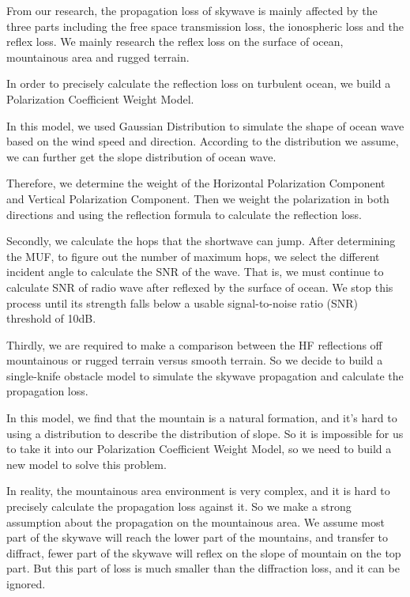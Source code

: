 \documentclass{mcmthesis}
\begin{document}
From our research, the propagation loss of skywave is mainly affected by the three parts including the free space transmission loss, the ionospheric loss and the reflex loss. We mainly research the reflex loss on the surface of ocean, mountainous area and rugged terrain.

In order to precisely calculate the reflection loss on turbulent ocean, we build a Polarization Coefficient Weight Model.

In this model, we used Gaussian Distribution to simulate the shape of ocean wave based on the wind speed and direction. According to the distribution we assume, we can further get the slope distribution of ocean wave.

 Therefore, we determine the weight of the Horizontal Polarization Component and Vertical Polarization Component. Then we weight the polarization in both directions and using the reflection formula to calculate the reflection loss.
 
Secondly, we calculate the hops that the shortwave can jump. After determining the MUF, to figure out the number of maximum hops, we select the different incident angle to calculate the SNR of the wave. That is, we must continue to calculate SNR of radio wave after reflexed by the surface of ocean. We stop this process until its strength falls below a usable signal-to-noise ratio (SNR) threshold of 10dB.

Thirdly, we are required to make a comparison between the HF reflections off mountainous or rugged terrain versus smooth terrain. So we decide to build a single-knife obstacle model to simulate the skywave propagation and calculate the propagation loss.

In this model, we find that the mountain is a natural formation, and it's hard to using a distribution to describe the distribution of slope. So it is impossible for us to take it into our Polarization Coefficient Weight Model, so we need to build a new model to solve this problem.

In reality, the mountainous area environment is very complex, and it is hard to precisely calculate the propagation loss against it. So we make a strong assumption about the propagation on the mountainous area. We assume most part of the skywave will reach the lower part of the mountains, and transfer to diffract, fewer part of the skywave will reflex on the slope of mountain on the top part. But this part of loss is much smaller than the diffraction loss, and it can be ignored.
\end{document}
